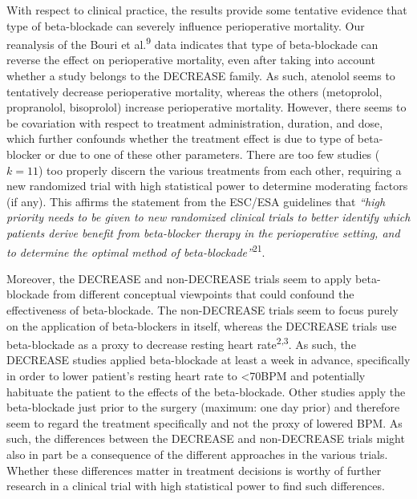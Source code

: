 \documentclass[]{article}
\begin{document}
With respect to clinical practice, the results provide some tentative
evidence that type of beta-blockade can severely influence perioperative
mortality. Our reanalysis of the Bouri et al.\textsuperscript{9} data
indicates that type of beta-blockade can reverse the effect on
perioperative mortality, even after taking into account whether a study
belongs to the DECREASE family. As such, atenolol seems to tentatively
decrease perioperative mortality, whereas the others (metoprolol,
propranolol, bisoprolol) increase perioperative mortality. However,
there seems to be covariation with respect to treatment administration,
duration, and dose, which further confounds whether the treatment effect
is due to type of beta-blocker or due to one of these other parameters.
There are too few studies (\(k=11\)) too properly discern the various
treatments from each other, requiring a new randomized trial with high
statistical power to determine moderating factors (if any). This affirms
the statement from the ESC/ESA guidelines that \emph{``high priority
needs to be given to new randomized clinical trials to better identify
which patients derive benefit from beta-blocker therapy in the
perioperative setting, and to determine the optimal method of
beta-blockade''}\textsuperscript{21}.

Moreover, the DECREASE and non-DECREASE trials seem to apply
beta-blockade from different conceptual viewpoints that could confound
the effectiveness of beta-blockade. The non-DECREASE trials seem to
focus purely on the application of beta-blockers in itself, whereas the
DECREASE trials use beta-blockade as a proxy to decrease resting heart
rate\textsuperscript{2,3}. As such, the DECREASE studies applied
beta-blockade at least a week in advance, specifically in order to lower
patient's resting heart rate to \textless{}70BPM and potentially
habituate the patient to the effects of the beta-blockade. Other studies
apply the beta-blockade just prior to the surgery (maximum: one day
prior) and therefore seem to regard the treatment specifically and not
the proxy of lowered BPM. As such, the differences between the DECREASE
and non-DECREASE trials might also in part be a consequence of the
different approaches in the various trials. Whether these differences
matter in treatment decisions is worthy of further research in a
clinical trial with high statistical power to find such differences.
\end{document}
